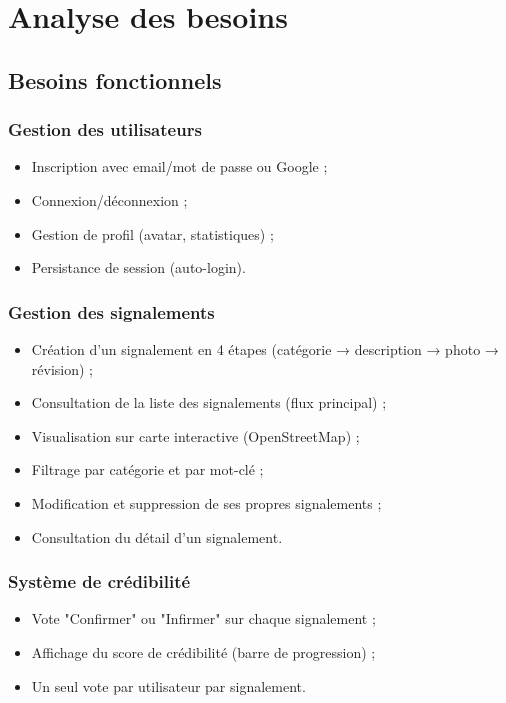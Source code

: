 \documentclass[12pt,a4paper]{report}
\begin{document}
\chapter{Analyse des besoins}

\section{Besoins fonctionnels}

\subsection{Gestion des utilisateurs}
\begin{itemize}
    \item Inscription avec email/mot de passe ou Google ;
    \item Connexion/déconnexion ;
    \item Gestion de profil (avatar, statistiques) ;
    \item Persistance de session (auto-login).
\end{itemize}

\subsection{Gestion des signalements}
\begin{itemize}
    \item Création d'un signalement en 4 étapes (catégorie → description → photo → révision) ;
    \item Consultation de la liste des signalements (flux principal) ;
    \item Visualisation sur carte interactive (OpenStreetMap) ;
    \item Filtrage par catégorie et par mot-clé ;
    \item Modification et suppression de ses propres signalements ;
    \item Consultation du détail d'un signalement.
\end{itemize}

\subsection{Système de crédibilité}
\begin{itemize}
    \item Vote "Confirmer" ou "Infirmer" sur chaque signalement ;
    \item Affichage du score de crédibilité (barre de progression) ;
    \item Un seul vote par utilisateur par signalement.
\end{itemize}
\end{document}
